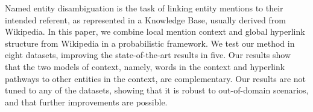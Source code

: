 Named entity disambiguation is the task of linking entity mentions to their intended referent, as represented in a Knowledge Base, usually derived from Wikipedia. In this paper, we combine local mention context and global hyperlink structure from Wikipedia in a probabilistic framework. We test our method in eight datasets, improving the state-of-the-art results in five. Our results show that the two models of context, namely, words in the context and hyperlink pathways to other entities in the context, are complementary. Our results are not tuned to any of the datasets, showing that it is robust to out-of-domain scenarios, and that further improvements are possible.
